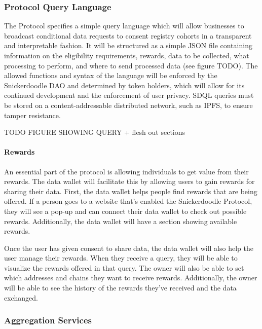 \subsubsection{Protocol Query Language} %
\label{section:SDQL}

The Protocol specifies a simple query language which will allow businesses to broadcast conditional data requests to consent registry cohorts in a transparent and interpretable fashion. 
It will be structured as a simple JSON file containing information on the eligibility requirements, rewards, data to be collected, what processing 
to perform, and where to send processed data (see figure TODO). The allowed functions and syntax of the language will be enforced by the 
Snickerdoodle DAO and determined by token holders, which will allow for its continued development and the enforcement of user privacy. SDQL 
queries must be stored on a content-addressable distributed network, such as IPFS, to ensure tamper resistance. 

TODO FIGURE SHOWING QUERY + flesh out sections

\paragraph{Rewards}

An essential part of the protocol is allowing individuals to get value from their rewards. The data wallet will facilitate this by allowing users 
to gain rewards for sharing their data. First, the data wallet helps people find rewards that are being offered. If a person goes to a website 
that's enabled the Snickerdoodle Protocol, they will see a pop-up and can connect their data wallet to check out possible rewards. Additionally, 
the data wallet will have a section showing available rewards.


Once the user has given consent to share data, the data wallet will also help the user manage their rewards. When they receive a query, they will 
be able to visualize the rewards offered in that query. The owner will also be able to set which addresses and chains they want to receive rewards. 
Additionally, the owner will be able to see the history of the rewards they've received and the data exchanged. 

\subsubsection{Aggregation Services} %


